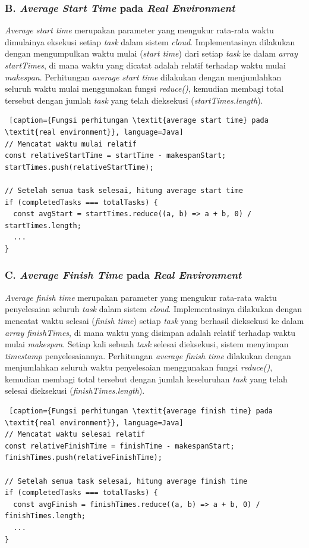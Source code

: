 \subsubsection{B. \textit{Average Start Time} pada \textit{Real Environment}}
\textit{Average start time} merupakan parameter yang mengukur rata-rata waktu dimulainya eksekusi setiap \textit{task} dalam sistem \textit{cloud}. Implementasinya dilakukan dengan mengumpulkan waktu mulai (\textit{start time}) dari setiap \textit{task} ke dalam \textit{array startTimes}, di mana waktu yang dicatat adalah relatif terhadap waktu mulai \textit{makespan}. Perhitungan \textit{average start time} dilakukan dengan menjumlahkan seluruh waktu mulai menggunakan fungsi \textit{reduce()}, kemudian membagi total tersebut dengan jumlah \textit{task} yang telah dieksekusi (\textit{startTimes.length}).

\begin{lstlisting} [caption={Fungsi perhitungan \textit{average start time} pada \textit{real environment}}, language=Java]
// Mencatat waktu mulai relatif
const relativeStartTime = startTime - makespanStart;
startTimes.push(relativeStartTime);

// Setelah semua task selesai, hitung average start time
if (completedTasks === totalTasks) {
  const avgStart = startTimes.reduce((a, b) => a + b, 0) / startTimes.length;
  ...
}
\end{lstlisting}

\subsubsection{C. \textit{Average Finish Time} pada \textit{Real Environment}}
\textit{Average finish time} merupakan parameter yang mengukur rata-rata waktu penyelesaian seluruh \textit{task} dalam sistem \textit{cloud}. Implementasinya dilakukan dengan mencatat waktu selesai (\textit{finish time}) setiap \textit{task} yang berhasil dieksekusi ke dalam \textit{array finishTimes}, di mana waktu yang disimpan adalah relatif terhadap waktu mulai \textit{makespan}. Setiap kali sebuah \textit{task} selesai dieksekusi, sistem menyimpan \textit{timestamp} penyelesaiannya. Perhitungan \textit{average finish time} dilakukan dengan menjumlahkan seluruh waktu penyelesaian menggunakan fungsi \textit{reduce()}, kemudian membagi total tersebut dengan jumlah keseluruhan \textit{task} yang telah selesai dieksekusi (\textit{finishTimes.length}).

\begin{lstlisting} [caption={Fungsi perhitungan \textit{average finish time} pada \textit{real environment}}, language=Java]
// Mencatat waktu selesai relatif
const relativeFinishTime = finishTime - makespanStart;
finishTimes.push(relativeFinishTime);

// Setelah semua task selesai, hitung average finish time
if (completedTasks === totalTasks) {
  const avgFinish = finishTimes.reduce((a, b) => a + b, 0) / finishTimes.length;
  ...
}
\end{lstlisting}


